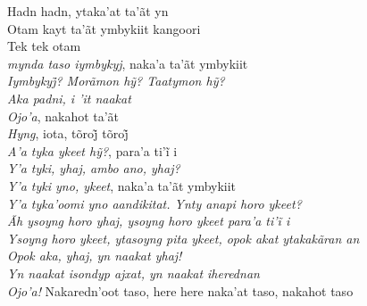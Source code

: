 \begin{linenumbers}\begingroup\raggedright

\noindent   Hadn hadn, ytaka'at ta'ãt yn\\
  Otam kayt ta'ãt ymbykiit kangoori\\
  Tek tek otam\\
  \emph{mynda taso iymbykyj}, naka'a ta'ãt ymbykiit\\
  \emph{Iymbykyj̃? Morãmon hỹ? Taatymon hỹ?}\\
  \emph{Aka padni, i 'it naakat}\\
  \emph{Ojo'a}, nakahot ta'ãt\\
  \emph{Hyng}, iota, tõroj̃ tõroj̃\\
  \emph{A’a tyka ykeet hỹ?}, para’a ti’ĩ i\\
  \emph{Y'a tyki, yhaj, ambo ano, yhaj?}\\
  \emph{Y'a tyki yno, ykeet}, naka'a ta'ãt ymbykiit\\
  \emph{Y'a tyka'oomi yno aandikitat. Ynty anapi horo ykeet?}\\
  \emph{Ãh ysoyng horo yhaj, ysoyng horo ykeet para’a ti’ĩ i}\\
  \emph{Ysoyng horo ykeet, ytasoyng pita ykeet, opok akat ytakakãran an}\\
  \emph{Opok aka, yhaj, yn naakat yhaj!}\\
  \emph{Yn naakat isondyp ajxat, yn naakat iherednan}\\
  \emph{Ojo'a!} Nakaredn'oot taso, here here naka'at taso, nakahot taso

\end{linenumbers}\endgroup

